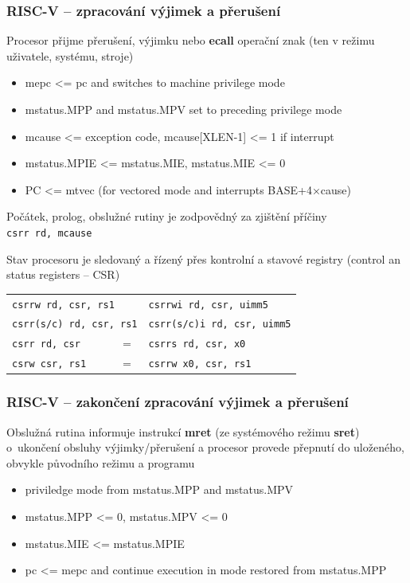 \documentclass{beamer}
\begin{document}
\begin{frame}
\frametitle{RISC-V -- zpracování výjimek a přerušení}

Procesor přijme přerušení, výjimku nebo \textbf{ecall} operační znak (ten v režimu uživatele, systému, stroje)

\begin{itemize}
 \item mepc <= pc and switches to machine privilege mode
 \item mstatus.MPP and mstatus.MPV set to preceding privilege mode
 \item mcause <= exception code, mcause[XLEN-1] <= 1 if interrupt
 \item mstatus.MPIE <= mstatus.MIE, mstatus.MIE <= 0
 \item PC <= mtvec (for vectored mode and interrupts BASE+4×cause)
\end{itemize}

Počátek, prolog, obslužné rutiny je zodpovědný za zjištění příčiny\\\texttt{csrr rd, mcause}

Stav procesoru je sledovaný a řízený přes kontrolní a stavové registry (control an status registers -- CSR)

\begin{tabular}{l c l}
\multicolumn{2}{l}{\texttt{csrrw rd, csr, rs1}} & \texttt{csrrwi rd, csr, uimm5} \\
\multicolumn{2}{l}{\texttt{csrr(s/c) rd, csr, rs1}}  & \texttt{csrr(s/c)i rd, csr, uimm5} \\
\texttt{csrr rd, csr} &  $=$  & \texttt{csrrs rd, csr, x0} \\
\texttt{csrw csr, rs1} &  $=$  & \texttt{csrrw x0, csr, rs1} \\
\end{tabular}
\end{frame}

\begin{frame}
\frametitle{RISC-V -- zakončení zpracování výjimek a přerušení}

Obslužná rutina informuje instrukcí \textbf{mret} (ze systémového režimu \textbf{sret})
o~ukončení obsluhy výjimky/přerušení a procesor provede přepnutí do uloženého, obvykle původního
režimu a programu

\begin{itemize}
 \item priviledge mode from mstatus.MPP and mstatus.MPV\footnotemark[1]
 \item mstatus.MPP <= 0, mstatus.MPV <= 0\footnotemark[1]
 \item mstatus.MIE <= mstatus.MPIE
 \item pc <= mepc and continue execution in mode restored from mstatus.MPP
\end{itemize}
\end{frame}
\end{document}

